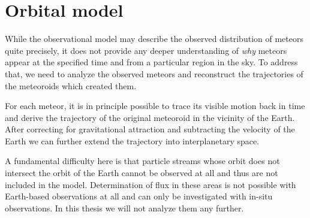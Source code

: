 %
%
%
%

\section{Orbital model} \label{mo}
    While the observational model may describe the observed distribution of meteors quite precisely,
    it does not provide any deeper understanding of \textit{why} meteors appear
    at the specified time and from a particular region in the sky.
    To address that, we need to analyze the observed meteors and reconstruct
    the trajectories of the meteoroids which created them.

    For each meteor, it is in principle possible to trace its visible motion back in time
    and derive the trajectory of the original meteoroid in the vicinity of the Earth.
    After correcting for gravitational attraction and subtracting the velocity of the Earth
    we can further extend the trajectory into interplanetary space.

    A fundamental difficulty here is that particle streams whose orbit does not intersect
    the orbit of the Earth cannot be observed at all and thus are not included in the model.
    Determination of flux in these areas is not possible with Earth-based observations at all
    and can only be investigated with in-situ observations. In this thesis we will not analyze them any further.

